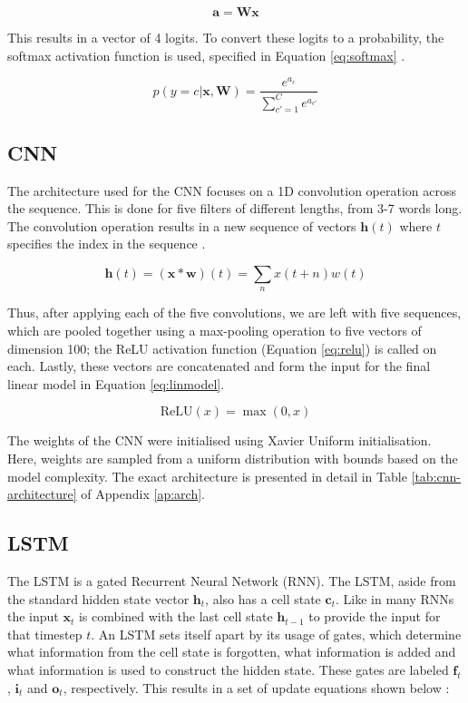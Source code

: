 \documentclass[12pt,a4paper,english]{article}
\begin{document}
\begin{equation}
    \boldsymbol{a} = \boldsymbol{W}\boldsymbol{x}
    \label{eq:linmodel}
\end{equation}

This results in a vector of 4 logits. To convert these logits to a probability, the softmax activation function is used, specified in Equation \eqref{eq:softmax} \cite{pml1Book}.

\begin{equation}
    p(y=c|\boldsymbol{x}, \boldsymbol{W}) = \frac{e^{a_c}}{\sum_{c'=1}^C e^{a_{c'}} }
    \label{eq:softmax}
\end{equation}

\subsection{CNN}
The architecture used for the CNN focuses on a 1D convolution operation across the sequence. This is done for five filters of different lengths, from 3-7 words long. The convolution operation results in a new sequence of vectors $\boldsymbol{h}(t)$ where $t$ specifies the index in the sequence \cite{Goodfellow-et-al-2016}.

\begin{equation}
    \boldsymbol{h}(t) = (\boldsymbol{x} * \boldsymbol{w})(t) = \sum_n x(t+n)w(t)
\end{equation}

Thus, after applying each of the five convolutions, we are left with five sequences, which are pooled together using a max-pooling operation to five vectors of dimension 100; the ReLU activation function (Equation \eqref{eq:relu}) is called on each. Lastly, these vectors are concatenated and form the input for the final linear model in Equation \eqref{eq:linmodel}.

\begin{equation}
    \text{ReLU} (x) = \max(0,x)
    \label{eq:relu}
\end{equation}

The weights of the CNN were initialised using Xavier Uniform initialisation. Here, weights are sampled from a uniform distribution with bounds based on the model complexity. The exact architecture is presented in detail in Table \ref{tab:cnn-architecture} of Appendix \ref{ap:arch}.

\subsection{LSTM}
The LSTM is a gated Recurrent Neural Network (RNN). The LSTM, aside from the standard hidden state vector $\boldsymbol{h}_t$, also has a cell state $\boldsymbol{c}_t$. Like in many RNNs the input $\boldsymbol{x}_t$ is combined with the last cell state $\boldsymbol{h}_{t-1}$ to provide the input for that timestep $t$. An LSTM sets itself apart by its usage of gates, which determine what information from the cell state is forgotten, what information is added and what information is used to construct the hidden state. These gates are labeled $\boldsymbol{f}_t$, $\boldsymbol{i}_t$ and $\boldsymbol{o}_t$, respectively. This results in a set of update equations shown below \cite{jm3}:
\end{document}
